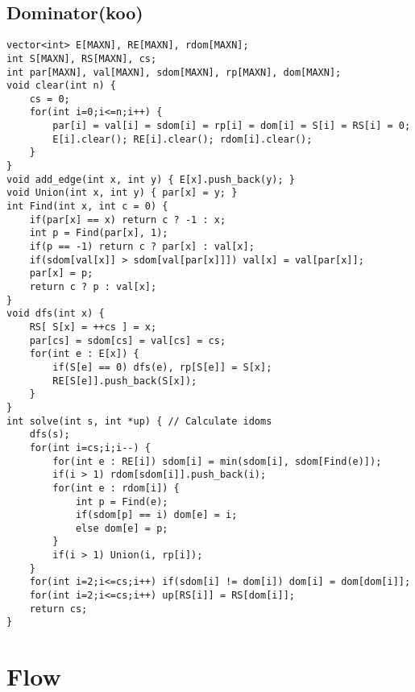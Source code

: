 \documentclass[landscape, 8pt, a4paper, oneside, twocolumn]{extarticle}
\begin{document}
\subsection {Dominator(koo)}
\begin{verbatim}
vector<int> E[MAXN], RE[MAXN], rdom[MAXN];
int S[MAXN], RS[MAXN], cs;
int par[MAXN], val[MAXN], sdom[MAXN], rp[MAXN], dom[MAXN];
void clear(int n) {
	cs = 0;
	for(int i=0;i<=n;i++) {
		par[i] = val[i] = sdom[i] = rp[i] = dom[i] = S[i] = RS[i] = 0;
		E[i].clear(); RE[i].clear(); rdom[i].clear();
	}
}
void add_edge(int x, int y) { E[x].push_back(y); }
void Union(int x, int y) { par[x] = y; }
int Find(int x, int c = 0) {
	if(par[x] == x) return c ? -1 : x;
	int p = Find(par[x], 1);
	if(p == -1) return c ? par[x] : val[x];
	if(sdom[val[x]] > sdom[val[par[x]]]) val[x] = val[par[x]];
	par[x] = p;
	return c ? p : val[x];
}
void dfs(int x) {
	RS[ S[x] = ++cs ] = x;
	par[cs] = sdom[cs] = val[cs] = cs;
	for(int e : E[x]) {
		if(S[e] == 0) dfs(e), rp[S[e]] = S[x];
		RE[S[e]].push_back(S[x]);
	}
}
int solve(int s, int *up) { // Calculate idoms
	dfs(s);
	for(int i=cs;i;i--) {
		for(int e : RE[i]) sdom[i] = min(sdom[i], sdom[Find(e)]);
		if(i > 1) rdom[sdom[i]].push_back(i);
		for(int e : rdom[i]) {
			int p = Find(e);
			if(sdom[p] == i) dom[e] = i;
			else dom[e] = p;
		}
		if(i > 1) Union(i, rp[i]);
	}
	for(int i=2;i<=cs;i++) if(sdom[i] != dom[i]) dom[i] = dom[dom[i]];
	for(int i=2;i<=cs;i++) up[RS[i]] = RS[dom[i]];
	return cs;
}
\end{verbatim}
\section{Flow}
\end{document}
